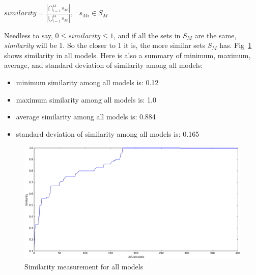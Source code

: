 \begin{center}
$similarity = \frac{|\bigcap_{i=1}^{13} s_{Mi}|}{|\bigcup_{i=1}^{13} s_{Mi}|}, \hspace{9pt} s_{Mi} \in S_M$
\end{center}
\vspace{6pt} 

Needless to say, $0 \leq similarity \leq 1$, and if all the sets in $S_M$ are the same, \textit{similarity} will be 1. So the closer to 1 it is, the more similar sets $S_M$ has. Fig~\ref{fig:sim} shows similarity in all models. Here is also a summary of minimum, maximum, average, and standard deviation of similarity among all models:
\begin{itemize}
  \item minimum similarity among all models is: 0.12
  \item maximum similarity among all models is: 1.0
  \item average similarity among all models is: 0.884
  \item standard deviation of similarity among all models is: 0.165
\end{itemize}


\begin{figure}
  \centering
  \includegraphics[width=\textwidth]{figs/similarity.png}
  \caption{\small{Similarity measurement for all models}}\label{fig:sim}
\end{figure}

\vspace{6pt}
\noindent{}
 \vspace{9pt}

